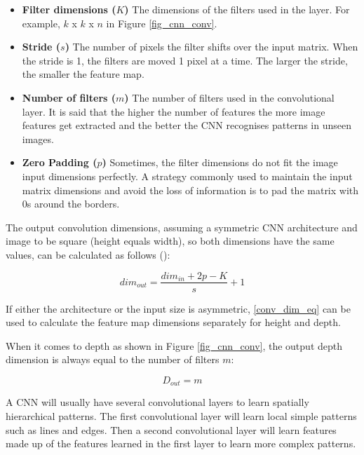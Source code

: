\begin{itemize}
    \item \textbf{Filter dimensions ($K$)} The dimensions of the filters used in the layer. For example, $k$ x $k$ x $n$ in Figure \ref{fig_cnn_conv}.
    \item \textbf{Stride ($s$)} The number of pixels the filter shifts over the input matrix. When the stride is 1, the filters are moved 1 pixel at a time. The larger the stride, the smaller the feature map.
    \item \textbf{Number of filters ($m$)} The number of filters used in the convolutional layer. It is said that the higher the number of features the more image features get extracted and the better the \gls{CNN} recognises patterns in unseen images.
    \item \textbf{Zero Padding ($p$)} Sometimes, the filter dimensions do not fit the image input dimensions perfectly. A strategy commonly used to maintain the input matrix dimensions and avoid the loss of information is to pad the matrix with 0s around the borders.
\end{itemize}
  
The output convolution dimensions, assuming a symmetric \gls{CNN} architecture and image to be square (height equals width), so both dimensions have the same values, can be calculated as follows (\cite{dumoulin2018guide}):

\begin{equation}
    \label{conv_dim_eq}
    dim_{out} = \frac{dim_{in} + 2p - K}{s} + 1
\end{equation}

If either the architecture or the input size is asymmetric, \ref{conv_dim_eq} can be used to calculate the feature map dimensions separately for height and depth.

When it comes to depth as shown in Figure \ref{fig_cnn_conv}, the output depth dimension is always equal to the number of filters $m$:

\begin{equation}
    \label{conv_depth_eq}
    D_{out} = m
\end{equation}

A \gls{CNN} will usually have several convolutional layers to learn spatially hierarchical patterns. The first convolutional layer will learn local simple patterns such as lines and edges. Then a second convolutional layer will learn features made up of the features learned in the first layer to learn more complex patterns. 

